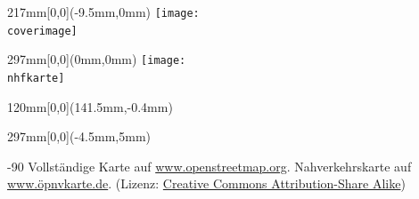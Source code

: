 \documentclass[a4paper]{memoir}
\begin{document}
\pagestyle{empty}

\begin{textblock*}{217mm}[0,0](-9.5mm,0mm)
    \texttt{[image: \\coverimage]} %
\end{textblock*}


\null
\newpage

\impressum{\redaktionsschluss}
\null
\newpage

\pagestyle{empty}

\begin{textblock*}{297mm}[0,0](0mm,0mm)
    \texttt{[image: \\nhfkarte]}
\end{textblock*}


\begin{textblock*}{120mm}[0,0](141.5mm,-0.4mm)
    \setlength\fboxsep{0pt}
    \setlength\fboxrule{0.4mm}
\end{textblock*}


\begin{textblock*}{297mm}[0,0](-4.5mm,5mm)
    \begin{turn}{-90}
        Vollständige Karte auf \url{www.openstreetmap.org}.
        Nahverkehrskarte auf \url{www.öpnvkarte.de}.
        (Lizenz: \href{http://creativecommons.org/licenses/by-sa/2.0/}{Creative Commons Attribution-Share Alike})
    \end{turn}
\end{textblock*}
\null
\newpage
\end{document}
